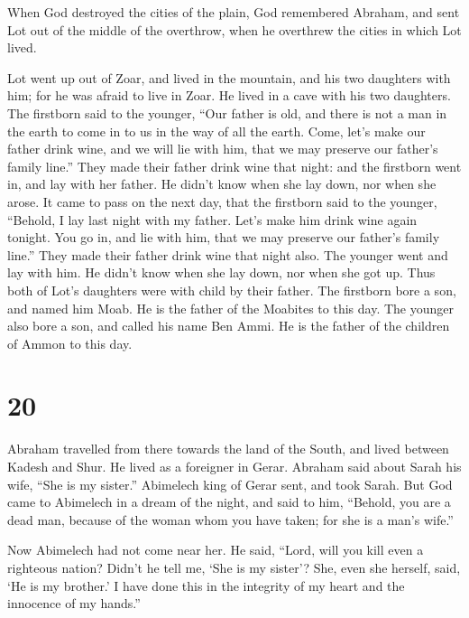  When God destroyed the cities of the plain, God
remembered Abraham, and sent Lot out of the middle of the overthrow,
when he overthrew the cities in which Lot lived.

 Lot went up out of Zoar, and lived in the mountain, and
his two daughters with him; for he was afraid to live in Zoar. He lived
in a cave with his two daughters.  The firstborn said to
the younger, ``Our father is old, and there is not a man in the earth to
come in to us in the way of all the earth.  Come, let's
make our father drink wine, and we will lie with him, that we may
preserve our father's family line.''  They made their
father drink wine that night: and the firstborn went in, and lay with
her father. He didn't know when she lay down, nor when she arose.
 It came to pass on the next day, that the firstborn said
to the younger, ``Behold, I lay last night with my father. Let's make
him drink wine again tonight. You go in, and lie with him, that we may
preserve our father's family line.''  They made their
father drink wine that night also. The younger went and lay with him. He
didn't know when she lay down, nor when she got up.  Thus
both of Lot's daughters were with child by their father. 
The firstborn bore a son, and named him Moab. He is the father of the
Moabites to this day.  The younger also bore a son, and
called his name Ben Ammi. He is the father of the children of Ammon to
this day.

\hypertarget{section-19}{%
\section{20}\label{section-19}}

 Abraham travelled from there towards the land of the
South, and lived between Kadesh and Shur. He lived as a foreigner in
Gerar.  Abraham said about Sarah his wife, ``She is my
sister.'' Abimelech king of Gerar sent, and took Sarah. 
But God came to Abimelech in a dream of the night, and said to him,
``Behold, you are a dead man, because of the woman whom you have taken;
for she is a man's wife.''

 Now Abimelech had not come near her. He said, ``Lord,
will you kill even a righteous nation?  Didn't he tell me,
`She is my sister'? She, even she herself, said, `He is my brother.' I
have done this in the integrity of my heart and the innocence of my
hands.''

